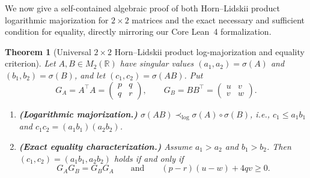 \documentclass[11pt,a4paper]{article}
\newtheorem{theorem}{Theorem}[section]
\theoremstyle{definition}
\newcommand{\R}{\mathbb{R}}
\begin{document}
We now give a self-contained algebraic proof of both Horn--Lidskii product logarithmic majorization for $2\times 2$ matrices and the exact necessary and sufficient condition for equality, directly mirroring our Core Lean~4 formalization.

\begin{theorem}[Universal $2\times 2$ Horn--Lidskii product log-majorization and equality criterion]\label{thm:2x2-logmaj}
Let $A, B \in M_2(\R)$ have singular values $(a_1, a_2) = \sigma(A)$ and $(b_1, b_2) = \sigma(B)$, and let $(c_1, c_2) = \sigma(AB)$. Put
\[
  G_A = A^\top A = \begin{pmatrix} p & q \\ q & r \end{pmatrix},
  \qquad
  G_B = B B^\top = \begin{pmatrix} u & v \\ v & w \end{pmatrix}.
\]
\begin{enumerate}
  \item[(a)] \textbf{(Logarithmic majorization.)} $\sigma(AB) \prec_{\log} \sigma(A)\circ\sigma(B)$, i.e., $c_1 \le a_1 b_1$ and $c_1 c_2 = (a_1 b_1)(a_2 b_2)$.
  \item[(b)] \textbf{(Exact equality characterization.)} Assume $a_1 > a_2$ and $b_1 > b_2$. Then $(c_1, c_2) = (a_1 b_1, a_2 b_2)$ holds if and only if
  \begin{equation}\label{eq:gram-aligned}
    G_A G_B = G_B G_A
    \qquad\text{and}\qquad
    (p - r)(u - w) + 4qv \ge 0.
  \end{equation}
\end{enumerate}
\end{theorem}
\end{document}
